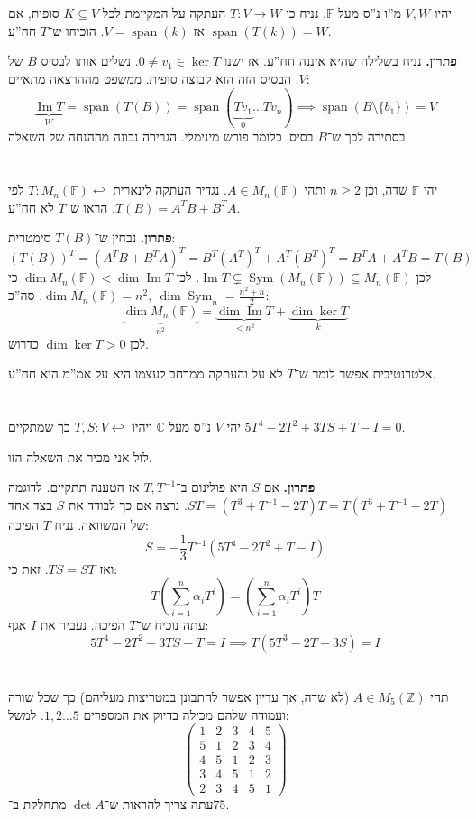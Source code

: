 \documentclass[]{article}
\newcommand\Z     {\mathbb{Z}}
\newcommand\C     {\mathbb{C}}
\DeclareMathOperator\Img   {Im}
\DeclareMathOperator{\Sp}     {span}
\newcommand\sumnio    {\sum_{i = 1}^{n}}
\DeclareMathOperator{\Sym}     {Sym}
\newcommand\F         {\mathbb{F}}
\newcommand\co        {\colon}
\newcommand\pms[1]    {\begin{pmatrix}
		#1
\end{pmatrix}}
\newcommand\ag        {\alpha}
\newcommand\op    {^{-1}}
\newcommand\cl [1]    {\left ( #1 \right )}
\theoremstyle{definition}
\newcommand\lilyarr {\hookleftarrow}
\begin{document}
	\section{}
	יהיו $V, W$ מ''ו נ''ס מעל $\F$. נניח כי $T \co V \to W$ העתקה על המקיימת לכל $K \subseteq V$ סופית, אם $\Sp(T(k)) = W$ אז $V = \Sp(k)$. הוכיחו ש־$T$ חח''ע. 
	
	\textbf{פתרון. }נניח בשלילה שהיא איננה חח''ע. אז ישנו $0 \neq v_1 \in \ker T$. נשלים אותו לבסיס $B$ של $V$. הבסיס הזה הוא קבוצה סופית. ממשפט מההרצאה מתאיים: 
	\[ \underbrace{\Img T}_W = \Sp(T(B)) = \Sp(\underbrace{Tv_1}_{0} \dots Tv_n) \implies \Sp(B \setminus \{b_1\}) = V \]
	בסתירה לכך ש־$B$ בסיס, כלומר פורש מינימלי. הגרירה נכונה מההנחה של השאלה. 
	
	\section{}
	יהי $\F$ שדה, וכן $n \ge 2$ ותהי $A \in M_n(\F)$. נגדיר העתקה לינארית $T \co M_n(\F) \lilyarr$ לפי $T(B) = A^TB + B^TA$. הראו ש־$T$ לא חח''ע. 
	
	\textbf{פתרון. }נבחין ש־$T(B)$ סימטרית: 
	\[ (T(B))^{T} = (A^TB + B^TA)^{T} = B^T(A^T)^T + A^T(B^T)^T = B^TA + A^TB = T(B) \]
	לכן $\Img T \subsetneq \Sym(M_n(\F)) \subseteq M_n(\F)$. לכן  $\dim M_n(\F) < \dim \Img T$ כי $\dim M_n(\F) = n^2, \ \dim \Sym_n = \frac{n^2 + n}{2}$. סה''כ: 
	\[ \underbrace{\dim M_n(\F)}_{n^2} = \underbrace{\dim \Img T}_{< n^2} + \underbrace{\dim \ker T}_{k } \]
	לכן $\dim \ker T > 0$ כדרוש. 
	
	אלטרנטיבית אפשר לומר ש־$T$ לא על והעתקה ממרחב לעצמו היא על אמ''מ היא חח''ע. 
	
	\section{}
	יהי $V$ נ''ס מעל $\C$ ויהיו $T, S \co V \lilyarr$ כך שמתקיים $5T^4 - 2T^2 + 3TS + T - I = 0$. 
	
	לול אני מכיר את השאלה הזו. 
	
	\textbf{פתרון. }אם $S$ היא פולינום ב־$T, T\op$ אז הטענה תתקיים. לדוגמה $ ST = (T^3 + T\op - 2T)T = T(T^3 + T\op - 2T)$. נרצה אם כך לבודד את $S$ בצד אחד של המשוואה. נניח $T$ הפיכה: 
	\[ S = -\frac{1}{3}T\op (5T^4  - 2T^2 + T - I) \]
	ואז $TS = ST$. זאת כי: 
	\[ T\cl{\sumnio \ag_i T^{i}} = \cl{\sumnio \ag_i T^i}T \]
	 עתה נוכיח ש־$T$ הפיכה. נעביר את $I$ אגף: 
	\[ 5T^4 - 2T^2 + 3TS + T = I \implies T(5T^3 - 2T + 3S) = I \]
	
	\section{}
	תהי $A \in M_5(\Z)$ (לא שדה, אך עדיין אפשר להתבונן במטריצות מעליהם) כך שכל שורה ועמודה שלהם מכילה בדיוק את המספרים $1, 2 \dots 5$. למשל: 
	\[ \pms{1 & 2 & 3 & 4 & 5 \\ 5 & 1 &2 &3 &4 \\ 4 &5 & 1 & 2 &3 \\ 3 & 4 & 5 & 1 & 2\\ 2 & 3 & 4 &5 & 1} \]
	עתה צריך להראות ש־$\det A$ מתחלקת ב־$75$. 
	
\end{document}
